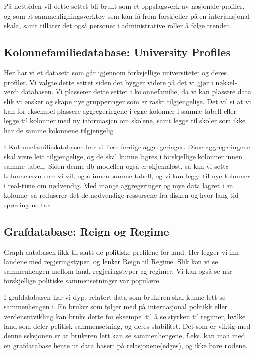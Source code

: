 På nettsiden vil dette settet bli brukt som et oppslagsverk av nasjonale profiler, og som et sammenligningsverktøy som kan få frem forskjeller på en interjansjonal skala, samt tillater det også personer i administrative roller å følge trender.

\subsection{Kolonnefamiliedatabase: University Profiles}
Her har vi et datasett som går igjennom forksjellige universiteter og deres profiler. Vi valgte dette settet siden det bygger videre på det vi gjør i nøkkel-verdi databasen. 
Vi plasserer dette settet i kolonnefamilie, da vi kan plassere data slik vi ønsker og skape nye grupperinger som er raskt tilgjengelige. Det vil si at vi kan for eksempel plassere aggregeringene i egne kolonner i samme tabell eller legge til kolonner med ny informasjon om skolene, samt legge til skoler som ikke har de samme kolonnene tilgjengelig.

I Kolonnefamiliedatabasen har vi flere ferdige aggregeringer. Disse aggregeringene skal være lett tilgjengelige, og de skal kunne lagres i forskjellige kolonner innen samme tabell. Siden denne db-modellen også er skjemaløst, så kan vi sette kolonnenavn som vi vil, også innen samme tabell, og vi kan legge til nye kolonner i real-time om nødvendig. Med mange aggregeringer og mye data lagret i en kolonne, så reduserer det de nødvendige ressursene fra disken og hvor lang tid spørringene tar.

\subsection{Grafdatabase: Reign og Regime}
Graph-databasen fikk til slutt de politiske profilene for land. Her legger vi inn landene med regjeringstyper, og lenker Reign til Regime. Slik kan vi se sammenhengen mellom land, regjeringstyper og regimer. Vi kan også se når forskjellige politiske sammensetninger var populære. 

I grafdatabasen har vi dypt relatert data som brukeren skal kunne lett se sammenhengen i. En bruker som følger med på internasjonal politikk eller verdensutvikling kan bruke dette for eksempel til å se styrken til regimer, hvilke land som deler politisk sammensetning, og deres stabilitet. Det som er viktig med denne seksjonen er at brukeren lett kan se sammenhengene, f.eks. kan man med en grafdatabase hente ut data basert på relasjonene(edges), og ikke bare nodene.